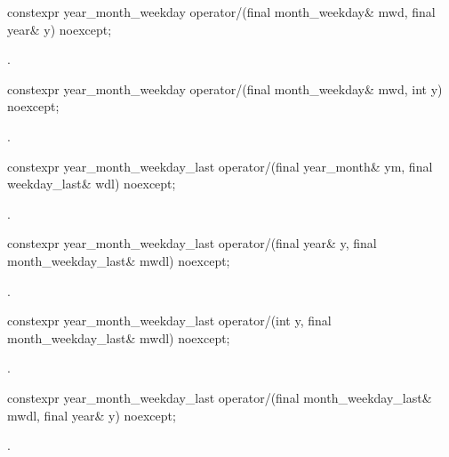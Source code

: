 \begin{itemdecl}
constexpr year_month_weekday
  operator/(final month_weekday& mwd, final year& y) noexcept;
\end{itemdecl}

\begin{itemdescr}
\pnum
\returns {}.
\end{itemdescr}

\begin{itemdecl}
constexpr year_month_weekday
  operator/(final month_weekday& mwd, int y) noexcept;
\end{itemdecl}

\begin{itemdescr}
\pnum
\returns {}.
\end{itemdescr}

\begin{itemdecl}
constexpr year_month_weekday_last
  operator/(final year_month& ym, final weekday_last& wdl) noexcept;
\end{itemdecl}

\begin{itemdescr}
\pnum
\returns {}.
\end{itemdescr}

\begin{itemdecl}
constexpr year_month_weekday_last
  operator/(final year& y, final month_weekday_last& mwdl) noexcept;
\end{itemdecl}

\begin{itemdescr}
\pnum
\returns {}.
\end{itemdescr}

\begin{itemdecl}
constexpr year_month_weekday_last
  operator/(int y, final month_weekday_last& mwdl) noexcept;
\end{itemdecl}

\begin{itemdescr}
\pnum
\returns {}.
\end{itemdescr}

\begin{itemdecl}
constexpr year_month_weekday_last
  operator/(final month_weekday_last& mwdl, final year& y) noexcept;
\end{itemdecl}

\begin{itemdescr}
\pnum
\returns {}.
\end{itemdescr}

